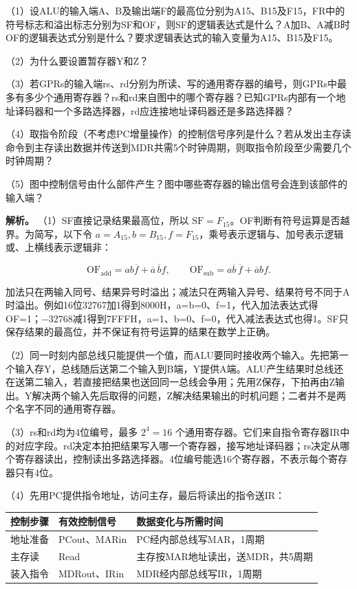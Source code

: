 （1）设ALU的输入端A、B及输出端F的最高位分别为A15、B15及F15，FR中的符号标志和溢出标志分别为SF和OF，则SF的逻辑表达式是什么？A加B、A减B时OF的逻辑表达式分别是什么？要求逻辑表达式的输入变量为A15、B15及F15。

（2）为什么要设置暂存器Y和Z？

（3）若GPRs的输入端rs、rd分别为所读、写的通用寄存器的编号，则GPRs中最多有多少个通用寄存器？rs和rd来自图中的哪个寄存器？已知GPRs内部有一个地址译码器和一个多路选择器，rd应连接地址译码器还是多路选择器？

（4）取指令阶段（不考虑PC增量操作）的控制信号序列是什么？若从发出主存读命令到主存读出数据并传送到MDR共需5个时钟周期，则取指令阶段至少需要几个时钟周期？

（5）图中控制信号由什么部件产生？图中哪些寄存器的输出信号会连到该部件的输入端？

\textbf{解析。} （1）SF直接记录结果最高位，所以 \(\mathrm{SF}=F_{15}\)。OF判断有符号运算是否越界。为简写，以下令 \(a=A_{15},b=B_{15},f=F_{15}\)，乘号表示逻辑与、加号表示逻辑或、上横线表示逻辑非：

\[
\mathrm{OF}_{\mathrm{add}}=ab\overline f+\overline a\,\overline b f,
\qquad
\mathrm{OF}_{\mathrm{sub}}=a\overline b\,\overline f+\overline a b f.
\]

加法只在两输入同号、结果异号时溢出；减法只在两输入异号、结果符号不同于A时溢出。例如16位32767加1得到8000H，a=b=0、f=1，代入加法表达式得OF=1；\ensuremath{-}32768减1得到7FFFH，a=1、b=0、f=0，代入减法表达式也得1。SF只保存结果的最高位，并不保证有符号运算的结果在数学上正确。

（2）同一时刻内部总线只能提供一个值，而ALU要同时接收两个输入。先把第一个输入存Y，总线随后送第二个输入到B端，Y提供A端。ALU产生结果时总线还在送第二输入，若直接把结果也送回同一总线会争用；先用Z保存，下拍再由Z输出。Y解决两个输入先后取得的问题，Z解决结果输出的时机问题；二者并不是两个名字不同的通用寄存器。

（3）rs和rd均为4位编号，最多 \(2^4=16\) 个通用寄存器。它们来自指令寄存器IR中的对应字段。rd决定本拍把结果写入哪一个寄存器，接写地址译码器；rs决定从哪个寄存器读出，控制读出多路选择器。4位编号能选16个寄存器，不表示每个寄存器只有4位。

（4）先用PC提供指令地址，访问主存，最后将读出的指令送IR：

\par\medskip\noindent\begin{minipage}{\linewidth}\fontsize{9.3}{12}\selectfont\begin{tabularx}{\linewidth}{@{}YYY@{}}
\toprule\noalign{}
控制步骤 & 有效控制信号 & 数据变化与所需时间 \\
\midrule\noalign{}


地址准备 & PCout、MARin & PC经内部总线写MAR，1周期 \\
主存读 & Read & 主存按MAR地址读出，送MDR，共5周期 \\
装入指令 & MDRout、IRin & MDR经内部总线写IR，1周期 \\
\bottomrule\end{tabularx}
\end{minipage}\par\medskip

